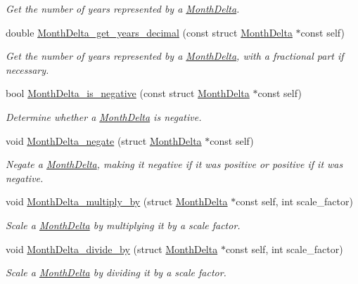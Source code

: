 \begin{DoxyCompactItemize}
\begin{DoxyCompactList}\small\item\em \-Get the number of years represented by a \hyperlink{structMonthDelta}{\-Month\-Delta}. \end{DoxyCompactList}\item 
double \hyperlink{month-delta_8h_afa5436ebc73fc5ce02c99f86a05d377c}{\-Month\-Delta\-\_\-get\-\_\-years\-\_\-decimal} (const struct \hyperlink{structMonthDelta}{\-Month\-Delta} $\ast$const self)
\begin{DoxyCompactList}\small\item\em \-Get the number of years represented by a \hyperlink{structMonthDelta}{\-Month\-Delta}, with a fractional part if necessary. \end{DoxyCompactList}\item 
bool \hyperlink{month-delta_8h_a03c4b1b8f6edca4c798b469e3f03bdfa}{\-Month\-Delta\-\_\-is\-\_\-negative} (const struct \hyperlink{structMonthDelta}{\-Month\-Delta} $\ast$const self)
\begin{DoxyCompactList}\small\item\em \-Determine whether a \hyperlink{structMonthDelta}{\-Month\-Delta} is negative. \end{DoxyCompactList}\item 
void \hyperlink{month-delta_8h_a4d77c910d4ec5841e5e3f59d63490078}{\-Month\-Delta\-\_\-negate} (struct \hyperlink{structMonthDelta}{\-Month\-Delta} $\ast$const self)
\begin{DoxyCompactList}\small\item\em \-Negate a \hyperlink{structMonthDelta}{\-Month\-Delta}, making it negative if it was positive or positive if it was negative. \end{DoxyCompactList}\item 
void \hyperlink{month-delta_8h_a24e21fbf270d561b1dccf2ab9e083ba0}{\-Month\-Delta\-\_\-multiply\-\_\-by} (struct \hyperlink{structMonthDelta}{\-Month\-Delta} $\ast$const self, int scale\-\_\-factor)
\begin{DoxyCompactList}\small\item\em \-Scale a \hyperlink{structMonthDelta}{\-Month\-Delta} by multiplying it by a scale factor. \end{DoxyCompactList}\item 
void \hyperlink{month-delta_8h_ad7d99e42e53f6f55ef885d754f433500}{\-Month\-Delta\-\_\-divide\-\_\-by} (struct \hyperlink{structMonthDelta}{\-Month\-Delta} $\ast$const self, int scale\-\_\-factor)
\begin{DoxyCompactList}\small\item\em \-Scale a \hyperlink{structMonthDelta}{\-Month\-Delta} by dividing it by a scale factor. \end{DoxyCompactList}\item 

\end{DoxyCompactItemize}

